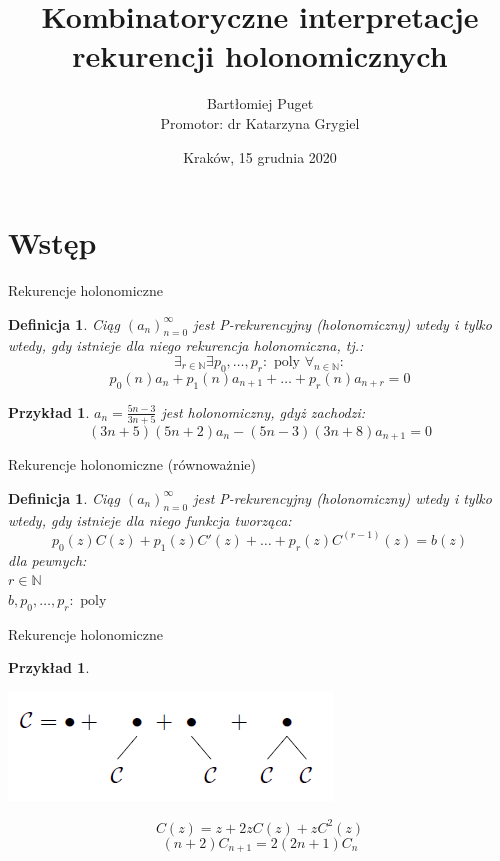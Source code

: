 \documentclass[final]{beamer}
\title{Kombinatoryczne interpretacje rekurencji holonomicznych}
\author[Bartłomiej Puget (TCS UJ)]{Bartłomiej Puget\\Promotor: dr Katarzyna Grygiel}
\institute{Theoretical Computer Science\\Jagiellonian University}
\date{Kraków, 15 grudnia 2020}
\theoremstyle{bluetheorem}
\theoremstyle{bluetheorem}
\newtheorem{mydefinition}[mytheorem]{Definicja}
\theoremstyle{greentheorem}
\newtheorem{myexample}[mytheorem]{Przykład}
\begin{document}
\maketitle

\section{Wstęp}

\begin{frame}{Rekurencje holonomiczne}
    \begin{mydefinition}
        Ciąg \((a_n)_{n=0}^\infty\) jest P-rekurencyjny (holonomiczny) wtedy i tylko wtedy, gdy istnieje dla niego rekurencja holonomiczna, tj.:
        \[\exists_{r \in \mathbb{N}} \exists {p_0, \ldots, p_r : \text{ poly }}\forall_{n \in \mathbb{N}}:\]
        \[p_0(n) a_n + p_1(n) a_{n + 1} + \ldots + p_r(n) a_{n + r} = 0\]
    \end{mydefinition}

    \begin{myexample}
        \(a_n = \frac{5 n - 3}{3 n + 5}\) jest holonomiczny, gdyż zachodzi:
        \[(3n + 5) (5n + 2) a_n - (5n - 3)(3n + 8) a_{n + 1} = 0\]
    \end{myexample}
\end{frame}

\begin{frame}{Rekurencje holonomiczne (równoważnie)}
    \begin{mydefinition}
        Ciąg \((a_n)_{n=0}^\infty\) jest P-rekurencyjny (holonomiczny) wtedy i tylko wtedy, gdy istnieje dla niego funkcja tworząca:
        \[p_0(z) C(z) + p_1(z) C'(z) + \ldots + p_r(z) C^{(r - 1)}(z) = b(z)\]
        dla pewnych:\\
        \(r \in \mathbb{N}\)\\
        \(b, p_0, \ldots, p_r : \text{ poly }\)
    \end{mydefinition}
\end{frame}

\begin{frame}{Rekurencje holonomiczne}
    \begin{myexample}
        \begin{center}
            \includegraphics[width=.5\textwidth]{catalan_image.png}
        \end{center}
        \[C(z) = z + 2 z C(z) + z C^2(z)\]
        \[(n + 2) C_{n + 1} = 2(2n + 1) C_n \]
    \end{myexample}
\end{frame}
\end{document}
